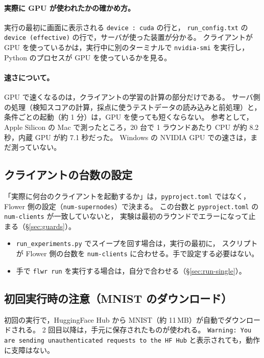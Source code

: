 \documentclass[a4j, dvipdfmx]{jsarticle}  %
\begin{document}
\paragraph{実際に GPU が使われたかの確かめ方。}
実行の最初に画面に表示される \texttt{device : cuda} の行と，
\texttt{run\_config.txt} の \texttt{device (effective)} の行で，サーバが使った装置が分かる。
クライアントが GPU を使っているかは，実行中に別のターミナルで \texttt{nvidia-smi} を実行し，
Python のプロセスが GPU を使っているかを見る。

\paragraph{速さについて。}
GPU で速くなるのは，クライアントの学習の計算の部分だけである。
サーバ側の処理（検知スコアの計算，採点に使うテストデータの読み込みと前処理）と，条件ごとの起動（約 1 分）は，GPU を使っても短くならない。
参考として，Apple Silicon の Mac で測ったところ，20 台で 1 ラウンドあたり CPU が約 8.2 秒，内蔵 GPU が約 7.1 秒だった。
Windows の NVIDIA GPU での速さは，まだ測っていない。

\subsection{クライアントの台数の設定}

「実際に何台のクライアントを起動するか」は，\texttt{pyproject.toml} ではなく，Flower 側の設定（\texttt{num-supernodes}）で決まる。
この台数と \texttt{pyproject.toml} の \texttt{num-clients} が一致していないと，
実験は最初のラウンドでエラーになって止まる（\S\ref{sec:guards}）。

\begin{itemize}
  \item \texttt{run\_experiments.py} でスイープを回す場合は，実行の最初に，
        スクリプトが Flower 側の台数を \texttt{num-clients} に合わせる。手で設定する必要はない。
  \item 手で \texttt{flwr run} を実行する場合は，自分で合わせる（\S\ref{sec:run-single}）。
\end{itemize}

\subsection{初回実行時の注意（MNIST のダウンロード）}

初回の実行で，HuggingFace Hub から MNIST（約 11\,MB）が自動でダウンロードされる。
2 回目以降は，手元に保存されたものが使われる。
\texttt{Warning: You are sending unauthenticated requests to the HF Hub} と表示されても，動作に支障はない。
\end{document}
